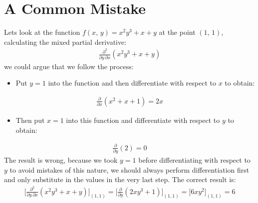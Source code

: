 \documentclass[letterpaper,10pt,english]{jupyterBook}
\begin{document}
\section{A Common Mistake}
\label{\detokenize{VectorCalculus/partialdifferentiation:a-common-mistake}}
\sphinxAtStartPar
Lets look at the function \(f(x,\, y) = x^2 y^3 + x + y\) at the point \((1,\, 1)\), calculating the mixed partial derivative:
\begin{equation*}
\begin{split}\frac{\partial^2}{\partial y\,\partial x}(x^2 y^3 + x + y)\end{split}
\end{equation*}
\sphinxAtStartPar
we could argue that we follow the process:
\begin{itemize}
\item {} 
\sphinxAtStartPar
Put \(y=1\) into the function and then differentiate with respect to \(x\) to obtain:

\end{itemize}
\begin{equation*}
\begin{split}\frac{\partial}{\partial x}(x^2+x+1)=2x\end{split}
\end{equation*}\begin{itemize}
\item {} 
\sphinxAtStartPar
Then put \(x=1\) into this function and differentiate with respect to \(y\) to obtain:

\end{itemize}
\begin{equation*}
\begin{split}\frac{\partial}{\partial y}(2)=0\end{split}
\end{equation*}
\sphinxAtStartPar
The result is wrong, because we took \(y=1\) before differentiating with respect to \(y\) \sphinxhyphen{} to avoid mistakes of this nature, we should always
perform differentiation first and only substitute in the values in the very last step. The correct result is:
\begin{equation*}
\begin{split}\Bigg[\frac{\partial^2}{\partial y\,\partial x}\left(x^2 y^3 +x+y\right)\Bigg]_{(1,1)} 
= \Bigg[\frac{\partial }{\partial y}(2xy^3+1)\Big]_{(1,1)} = \Big[6xy^2\Bigg]_{(1,1)} = 6\end{split}
\end{equation*}
\end{document}
